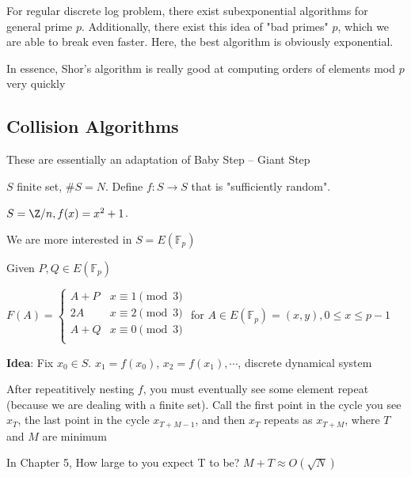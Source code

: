 \documentclass[10pt]{article}
\newcommand{\F}{\mathbb{F}}
\begin{document}
\begin{rmk}
    For regular discrete log problem, there exist subexponential algorithms for general prime $p$. Additionally, there exist this idea of "bad primes" $p$, which we are able to break even faster. Here, the best algorithm is obviously exponential.
\end{rmk}

\begin{rmk}
    In essence, Shor's algorithm is really good at computing orders of elements mod $p$ very quickly
\end{rmk}

\subsection{Collision Algorithms} These are essentially an adaptation of Baby Step -- Giant Step

$S$ finite set, $\#S = N$. Define $f : S \to S$ that is "sufficiently random".

\begin{exm*}
    $S  = \Z/n, f(x) = x^2 + 1$.
\end{exm*}

We are more interested in $S = E(\F_p)$

Given $P, Q \in E(\F_p)$

$F(A) = \begin{cases}
    A + P & x \equiv 1\pmod{3}\\
    2A & x \equiv 2\pmod{3}\\
    A + Q & x \equiv 0\pmod{3}\\
\end{cases}$ \hspace{1em} for $A \in E(\F_p) = (x, y), 0 \leq x \leq p-1$

\textbf{Idea}: Fix $x_0 \in S$. $x_1 = f(x_0)$, $x_2 = f(x_1), \cdots$, discrete dynamical system

After repeatitively nesting $f$, you must eventually see some element repeat (because we are dealing with a finite set). Call the first point in the cycle you see $x_T$, the last point in the cycle $x_{T + M - 1}$, and then $x_T$ repeats as $x_{T + M}$, where $T$ and $M$ are minimum

\begin{rmk}
    In Chapter 5, How large to you expect T to be? $M + T \approx O(\sqrt{N})$
\end{rmk}
\end{document}
